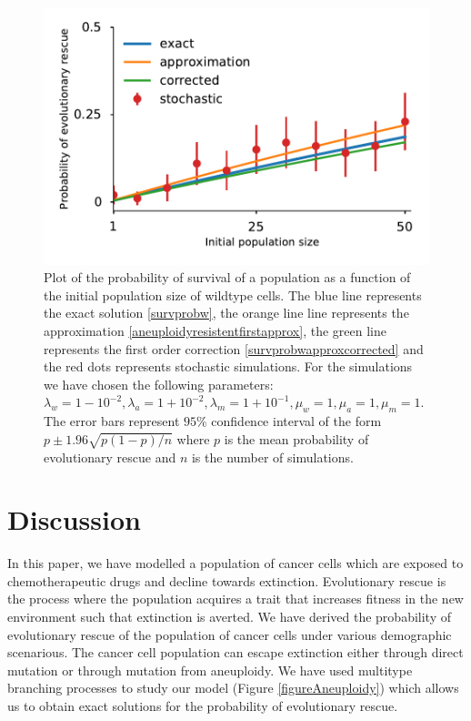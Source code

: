 \documentclass[12pt]{extarticle}
\begin{document}
\begin{figure}[!t]
 \vspace*{1\baselineskip}
\includegraphics[width=1\textwidth]{Figures/SurvPlotNData.pdf}
\caption{Plot of the probability of survival of a population as a function of the initial population size of wildtype cells. The blue line represents the exact solution \eqref{survprobw}, the orange line line represents the approximation \eqref{aneuploidyresistentfirstapprox}, the green line represents the first order correction \eqref{survprobwapproxcorrected} and the red dots represents stochastic simulations. For the simulations we have chosen the following parameters: $\lambda_w=1-10^{-2}, \lambda_a=1+10^{-2},\lambda_m=1+10^{-1},\mu_w=1,\mu_a=1,\mu_m=1$. The error bars represent $95\%$ confidence interval of the form $p\pm1.96\sqrt{p\left(1-p\right)/n}$ where $p$ is the mean probability of evolutionary rescue and $n$ is the number of simulations.}
\label{SurvPlotNData}
\end{figure}



\newpage
\section*{Discussion}

In this paper, we have modelled a population of cancer cells which are exposed to chemotherapeutic drugs and decline towards extinction. Evolutionary rescue  is the process where the population acquires a trait that increases fitness in the new environment such that extinction is averted. We have derived the probability of evolutionary rescue of the population of cancer cells under various demographic scenarious. The cancer cell population can escape extinction either through direct mutation or through mutation from aneuploidy. We have used multitype branching processes to study our model (Figure \ref{figureAneuploidy}) which allows us to obtain exact solutions for the probability of evolutionary rescue.
\end{document}
